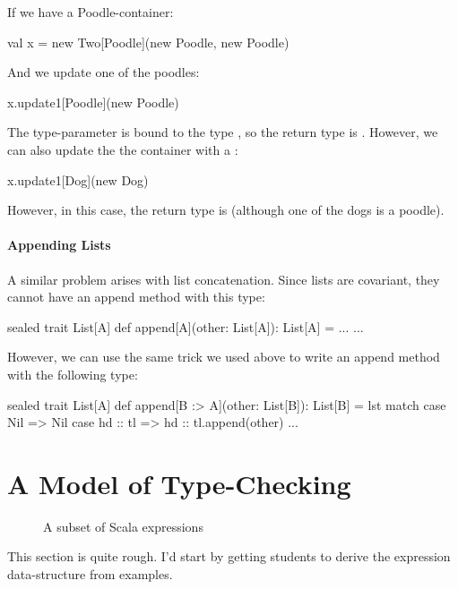 \documentclass{book}
\begin{document}
If we have a Poodle-container:
\begin{scalacode}
val x = new Two[Poodle](new Poodle, new Poodle)
\end{scalacode}
And we update one of the poodles:
\begin{scalacode}
x.update1[Poodle](new Poodle)
\end{scalacode}
The type-parameter  is bound to the type ,
so the return type is . However, we can also
update the the container with a :
\begin{scalacode}
x.update1[Dog](new Dog)
\end{scalacode}
However, in this case, the return type is  (although one
of the dogs is a poodle).

\paragraph{Appending Lists}
A similar problem arises with list concatenation. Since lists are covariant,
they cannot have an append method with this type:
\begin{scalacode}
sealed trait List[A] {
  def append[A](other: List[A]): List[A] = ...
  ...
}
\end{scalacode}

However, we can use the same trick we used above to write an append
method with the following type:

\begin{scalacode}
sealed trait List[A] {
  def append[B :> A](other: List[B]): List[B] = lst match {
    case Nil => Nil
    case hd :: tl => hd :: tl.append(other)
  }
  ...
}
\end{scalacode}

\section{A Model of Type-Checking}

\begin{figure}
\caption{A subset of Scala expressions}\label{scalafragment}
\end{figure}

\begin{instructor}
This section is quite rough. I'd start by getting students to derive the expression data-structure from examples.
\end{instructor}
\end{document}
